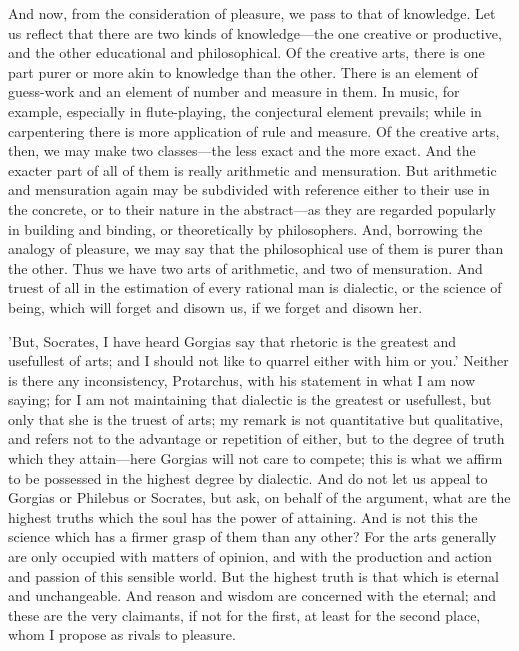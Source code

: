 \documentclass[11pt,letter]{article}
\begin{document}
\par  And now, from the consideration of pleasure, we pass to that of knowledge. Let us reflect that there are two kinds of knowledge—the one creative or productive, and the other educational and philosophical. Of the creative arts, there is one part purer or more akin to knowledge than the other. There is an element of guess-work and an element of number and measure in them. In music, for example, especially in flute-playing, the conjectural element prevails; while in carpentering there is more application of rule and measure. Of the creative arts, then, we may make two classes—the less exact and the more exact. And the exacter part of all of them is really arithmetic and mensuration. But arithmetic and mensuration again may be subdivided with reference either to their use in the concrete, or to their nature in the abstract—as they are regarded popularly in building and binding, or theoretically by philosophers. And, borrowing the analogy of pleasure, we may say that the philosophical use of them is purer than the other. Thus we have two arts of arithmetic, and two of mensuration. And truest of all in the estimation of every rational man is dialectic, or the science of being, which will forget and disown us, if we forget and disown her.

\par  'But, Socrates, I have heard Gorgias say that rhetoric is the greatest and usefullest of arts; and I should not like to quarrel either with him or you.' Neither is there any inconsistency, Protarchus, with his statement in what I am now saying; for I am not maintaining that dialectic is the greatest or usefullest, but only that she is the truest of arts; my remark is not quantitative but qualitative, and refers not to the advantage or repetition of either, but to the degree of truth which they attain—here Gorgias will not care to compete; this is what we affirm to be possessed in the highest degree by dialectic. And do not let us appeal to Gorgias or Philebus or Socrates, but ask, on behalf of the argument, what are the highest truths which the soul has the power of attaining. And is not this the science which has a firmer grasp of them than any other? For the arts generally are only occupied with matters of opinion, and with the production and action and passion of this sensible world. But the highest truth is that which is eternal and unchangeable. And reason and wisdom are concerned with the eternal; and these are the very claimants, if not for the first, at least for the second place, whom I propose as rivals to pleasure.
\end{document}
